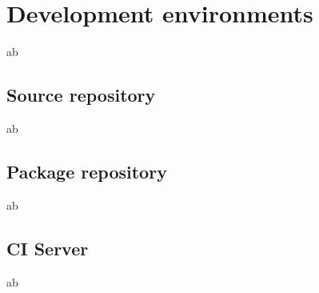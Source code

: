 \chapter{Development environments}

ab

\section{Source repository}

ab

\section{Package repository}

ab

\section{CI Server}

ab